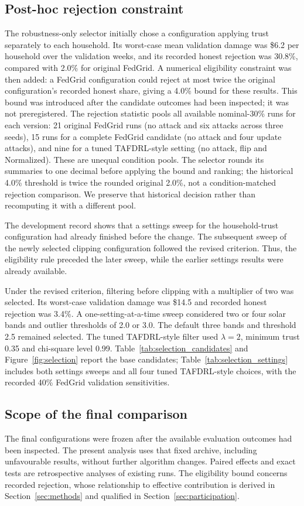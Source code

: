 \documentclass[preprint,12pt,a4paper]{elsarticle}
\begin{document}
\subsection{Post-hoc rejection constraint}
The robustness-only selector initially chose a configuration applying trust separately to each household. Its worst-case mean validation damage was \$6.2 per household over the validation weeks, and its recorded honest rejection was 30.8\%, compared with 2.0\% for original FedGrid. A numerical eligibility constraint was then added: a FedGrid configuration could reject at most twice the original configuration's recorded honest share, giving a 4.0\% bound for these results. This bound was introduced after the candidate outcomes had been inspected; it was not preregistered. The rejection statistic pools all available nominal-30\% runs for each version: 21 original FedGrid runs (no attack and six attacks across three seeds), 15 runs for a complete FedGrid candidate (no attack and four update attacks), and nine for a tuned TAFDRL-style setting (no attack, flip and Normalized). These are unequal condition pools. The selector rounds its summaries to one decimal before applying the bound and ranking; the historical 4.0\% threshold is twice the rounded original 2.0\%, not a condition-matched rejection comparison. We preserve that historical decision rather than recomputing it with a different pool.

The development record shows that a settings sweep for the household-trust configuration had already finished before the change. The subsequent sweep of the newly selected clipping configuration followed the revised criterion. Thus, the eligibility rule preceded the later sweep, while the earlier settings results were already available.

Under the revised criterion, filtering before clipping with a multiplier of two was selected. Its worst-case validation damage was \$14.5 and recorded honest rejection was 3.4\%. A one-setting-at-a-time sweep considered two or four solar bands and outlier thresholds of 2.0 or 3.0. The default three bands and threshold 2.5 remained selected. The tuned TAFDRL-style filter used $\lambda=2$, minimum trust 0.35 and chi-square level 0.99. Table~\ref{tab:selection_candidates} and Figure~\ref{fig:selection} report the base candidates; Table~\ref{tab:selection_settings} includes both settings sweeps and all four tuned TAFDRL-style choices, with the recorded 40\% FedGrid validation sensitivities.

\subsection{Scope of the final comparison}
The final configurations were frozen after the available evaluation outcomes had been inspected. The present analysis uses that fixed archive, including unfavourable results, without further algorithm changes. Paired effects and exact tests are retrospective analyses of existing runs. The eligibility bound concerns recorded rejection, whose relationship to effective contribution is derived in Section~\ref{sec:methods} and qualified in Section~\ref{sec:participation}.
\end{document}
